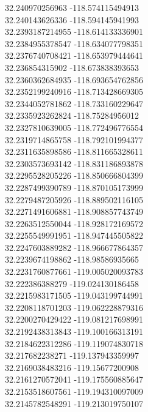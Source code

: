 {32.240970256963	-118.574115494913\\
32.240143626336	-118.594145941993\\
32.2393187214955	-118.614133336901\\
32.2384955378547	-118.634077798351\\
32.2376740708421	-118.653979444641\\
32.236854315902	-118.673838393653\\
32.2360362684935	-118.693654762856\\
32.2352199240916	-118.713428669305\\
32.2344052781862	-118.733160229647\\
32.2335923262824	-118.75284956012\\
32.2327810639005	-118.772496776554\\
32.2319714865758	-118.792101994377\\
32.2311635898586	-118.811665328611\\
32.2303573693142	-118.831186893878\\
32.2295528205226	-118.850666804399\\
32.2287499390789	-118.870105173999\\
32.2279487205926	-118.889502116105\\
32.2271491606881	-118.908857743749\\
32.2263512550044	-118.928172169572\\
32.2255549991951	-118.947445505822\\
32.2247603889282	-118.966677864357\\
32.2239674198862	-118.98586935665\\
32.2231760877661	-119.005020093783\\
32.222386388279	-119.024130186458\\
32.2215983171505	-119.043199744991\\
32.2208118701203	-119.062228879316\\
32.2200270429422	-119.081217698991\\
32.2192438313843	-119.100166313191\\
32.2184622312286	-119.119074830718\\
32.217682238271	-119.137943359997\\
32.2169038483216	-119.15677200908\\
32.2161270572041	-119.175560885647\\
32.2153518607561	-119.194310097009\\
32.2145782548291	-119.213019750107\\
}
